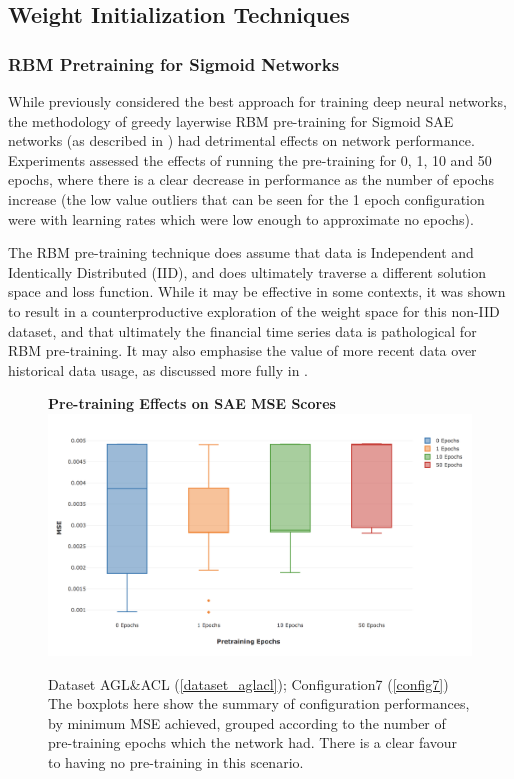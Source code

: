 \documentclass[a4paper,11pt,oneside]{article}
\theoremstyle{plain}
\theoremstyle{definition}
\begin{document}
\newpage
\subsection{Weight Initialization Techniques}

\subsubsection{RBM Pretraining for Sigmoid Networks}

While previously considered the best approach for training deep neural networks, the methodology of greedy layerwise RBM pre-training for Sigmoid SAE networks (as described in \cite{Hinton2}) had detrimental effects on network performance. Experiments assessed the effects of running the pre-training for 0, 1, 10 and 50 epochs, where there is a clear decrease in performance as the number of epochs increase (the low value outliers that can be seen for the 1 epoch configuration were with learning rates which were low enough to approximate no epochs). \newline

The RBM pre-training technique does assume that data is Independent and Identically Distributed (IID), and does ultimately traverse a different solution space and loss function. While it may be effective in some contexts, it was shown to result in a counterproductive exploration of the weight space for this non-IID dataset, and that ultimately the financial time series data is pathological for RBM pre-training. It may also emphasise the value of more recent data over historical data usage, as discussed more fully in . \newline

\begin{figure}[H]
	\centering
	\textbf{Pre-training Effects on SAE MSE Scores} 
	\includegraphics[scale=0.35]{images/results/init/Pretraining.png}
	\caption{Dataset AGL\&ACL (\ref{dataset_aglacl}); Configuration7 (\ref{config7})
		\newline \newline The boxplots here show the summary of configuration performances, by minimum MSE achieved, grouped according to the number of pre-training epochs which the network had. There is a clear favour to having no pre-training in this scenario.}
	\label{figure-results-pretraining-effect}
\end{figure}		
\end{document}
